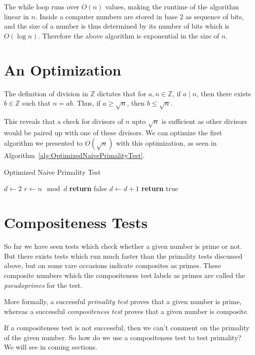 \documentclass[11pt]{article}
\begin{document}
The while loop runs over $O(n)$ values, making the runtime of the algorithm linear in $n$. Inside a computer numbers are stored in base $2$ as sequence of bits, and the size of a number is thus determined by its number of bits which is $O(\log n)$. Therefore the above algorithm is exponential in the size of $n$.

\section{An Optimization}
The definition of division in $\mathbb{Z}$ dictates that for $a, n \in \mathbb{Z}$, if $a \mid n$, then there exists $b \in \mathbb{Z}$ such that $n = ab$. Thus, if $a \geq \sqrt n$, then $b \leq \sqrt n$. 

 This reveals that a check for divisors of $n$ upto $\sqrt n$ is sufficient as other divisors would be paired up with one of these divisors. We can optimize the first algorithm we presented to $O(\sqrt n)$ with this optimization, as seen in Algorithm~\ref{alg:OptimizedNaivePrimalityTest}.
 
\begin{algorithm}
\caption{Optimized Naive Primality Test}
\label{alg:OptimizedNaivePrimalityTest}
\begin{algorithmic}
\State $d\gets 2$
\State $r\gets n \mod d$
	\State \textbf{return} false 
\EndIf
\State $d \gets d+1$
\EndWhile
\State \textbf{return} true 
\EndProcedure
\end{algorithmic}
\end{algorithm}

\section{Compositeness Tests}
So far we have seen tests which check whether a given number is prime or not. But there exists tests which run much faster than the primality tests discussed above, but on some rare occasions indicate composites as primes. These composite numbers which the compositeness test labels as primes are called the \emph{pseudoprimes} for the test.

More formally, a successful \emph{primality test} proves that a given number is prime, whereas a successful \emph{compositeness test} proves that a given number is composite. 

If a compositeness test is not successful, then we can't comment on the primality of the given number. So how do we use a compositeness test to test primality? We will see in coming sections.
\end{document}
